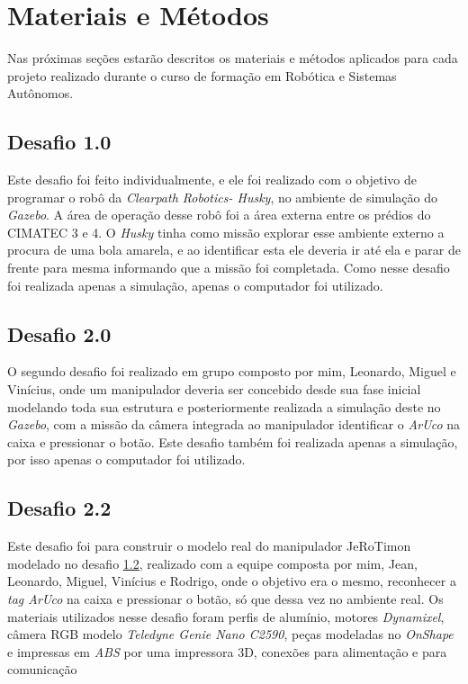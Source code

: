 \chapter{Materiais e Métodos}
\label{chap:mat}
Nas próximas seções estarão descritos os materiais e métodos aplicados para cada projeto realizado durante o curso de formação em Robótica e Sistemas Autônomos. 

\section{Desafio 1.0}
\label{sec:met_desafio1}
Este desafio foi feito individualmente, e ele foi realizado com o objetivo de programar o robô da \textit{Clearpath Robotics- Husky}, no ambiente de simulação do \textit{Gazebo}. A área de operação desse robô foi a área externa entre os prédios do CIMATEC 3 e 4. O \textit{Husky} tinha como missão explorar esse ambiente externo a procura de uma bola amarela, e ao identificar esta ele deveria ir até ela e parar de frente para mesma informando que a missão foi completada. Como nesse desafio foi realizada apenas a simulação, apenas o computador foi utilizado.  

\section{Desafio 2.0}
\label{sec:met_desafio2}
O segundo desafio foi realizado em grupo composto por mim, Leonardo, Miguel e Vinícius, onde um manipulador deveria ser concebido desde sua fase inicial modelando toda sua estrutura e posteriormente realizada a simulação deste no \textit{Gazebo}, com a missão da câmera integrada ao manipulador identificar o \textit{ArUco} na caixa e pressionar o botão. Este desafio também foi realizada apenas a simulação, por isso apenas o computador foi utilizado.  

\section{Desafio 2.2}
\label{sec:met_desafio2_2}
Este desafio foi para construir o modelo real do manipulador JeRoTimon modelado no desafio \ref{sec:met_desafio2}, realizado com a equipe composta por mim, Jean, Leonardo, Miguel, Vinícius e Rodrigo, onde o objetivo era o mesmo, reconhecer a \textit{tag ArUco} na caixa e pressionar o botão, só que dessa vez no ambiente real. Os materiais utilizados nesse desafio foram perfis de alumínio, motores \textit{Dynamixel}, câmera RGB modelo \textit{Teledyne Genie Nano C2590},  peças modeladas no \textit{OnShape} e impressas em \textit{ABS} por uma impressora 3D, conexões para alimentação e para comunicação

